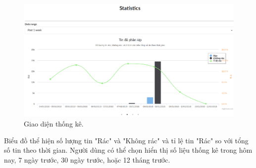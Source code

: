 \begin{figure}[H]
	\centering
	\includegraphics[width=0.96\linewidth]{Chapter3/Chapter3Figs/Chart2.png}
	\caption{Giao diện thống kê.}
	\label{fig:streamingkeywords}
\end{figure}
 Biểu đồ thể hiện số lượng tin "Rác" và "Không rác" và tỉ lệ tin "Rác" so với tổng số tin theo thời gian. Người dùng có thể chọn hiển thị số liệu thống kê trong hôm nay, 7 ngày trước, 30 ngày trước, hoặc 12 tháng trước.

